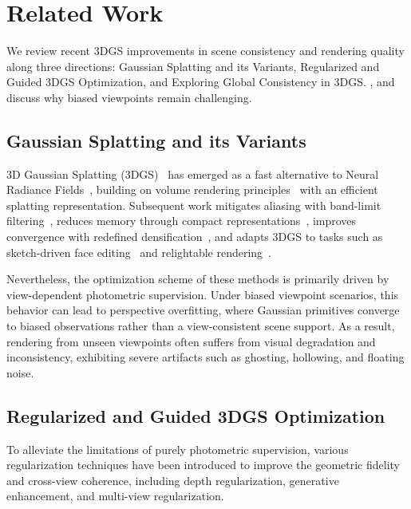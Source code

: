 \documentclass[lettersize,journal]{IEEEtran}
\begin{document}
\section{Related Work}

We review recent 3DGS improvements in scene consistency and rendering quality along three directions: Gaussian Splatting and its Variants, Regularized and Guided 3DGS Optimization, and Exploring Global Consistency in 3DGS.
, and discuss why biased viewpoints remain challenging.


\subsection{Gaussian Splatting and its Variants}

3D Gaussian Splatting (3DGS)~\cite{3dgs} has emerged as a fast alternative to Neural Radiance Fields~\cite{nerf}, building on volume rendering principles~\cite{ewa} with an efficient splatting representation. 
Subsequent work mitigates aliasing with band-limit filtering~\cite{mipsplatting}, reduces memory through compact representations~\cite{scaffold,hi-lsplat}, improves convergence with redefined densification~\cite{ekf-gs,densesplat,steepgs,mcmc}, and adapts 3DGS to tasks such as sketch-driven face editing~\cite{sketchfacegs} and relightable rendering~\cite{ssdgs}.

Nevertheless,
the optimization scheme of these methods is primarily driven by view-dependent photometric supervision. Under biased viewpoint scenarios, this behavior can lead to perspective overfitting, where Gaussian primitives converge to biased observations rather than a view-consistent scene support. As a result, rendering from unseen viewpoints often suffers from visual degradation and inconsistency, exhibiting severe artifacts such as ghosting, hollowing, and floating noise.

\subsection{Regularized and Guided 3DGS Optimization}

To alleviate the limitations of purely photometric supervision, various regularization techniques have been introduced to improve the geometric fidelity and cross-view coherence, including depth regularization, generative enhancement, and multi-view regularization. 
\end{document}
